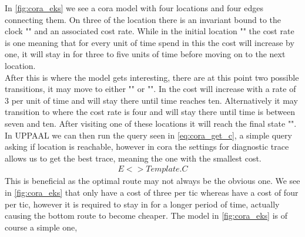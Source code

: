 In \cref{fig:cora_eks} we see a \gls{cora} model with four locations and four edges connecting them. On three of the location there is an invariant bound to the clock "" and an associated cost rate. While in the initial location "" the cost rate is one meaning that for every unit of time spend in this  the cost will increase by one, it will stay in  for three to five units of time before moving on to the next location.\\
After this is where the model gets interesting, there are at this point two possible transitions, it may move to either "" or "". In  the cost will increase with a rate of 3 per unit of time and will stay there until time reaches ten. Alternatively it may transition to  where the cost rate is four and will stay there until time is between seven and ten. After visiting one of these locations it will reach the final state "". \\
In UPPAAL we can then run the query seen in \cref{eq:cora_get_c}, a simple query asking if location  is reachable, however in \gls{cora} the settings for diagnostic trace allows us to get the best trace, meaning the one with the smallest cost.
\begin{align}
E<> Template.C
\label{eq:cora_get_c}
\end{align}
This is beneficial as the optimal route may not always be the obvious one. We see in \cref{fig:cora_eks} that  only have a cost of three per tic whereas  have a cost of four per tic, however it is required to stay in  for a longer period of time, actually causing the bottom route to become cheaper.
The model in \cref{fig:cora_eks} is of course a simple one,







